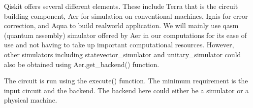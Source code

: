 \documentclass{article}
\begin{document}
Qiskit offers several different elements. These include Terra that is the circuit building component, Aer for simulation on conventional machines, Ignis for error correction, and Aqua to build realworld application. We will mainly use qasm (quantum assembly) simulator offered by Aer in our computations for its ease of use and not having to take up important computational resources. However, other simulators including statevector\_simulator and unitary\_simulator could also be obtained using Aer.get\_backend() function.

The circuit is run using the execute() function. The minimum requirement is the input circuit and the backend. The backend here could either be a simulator or a physical machine.

\newpage
\printbibliography
\end{document}
